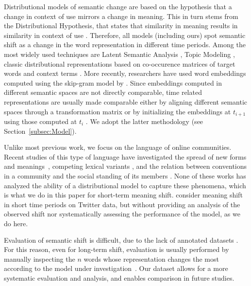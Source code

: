Distributional models of semantic change are based on the hypothesis
that a change in context of use mirrors a change in meaning.
This in turn stems from the Distributional Hypothesis, that states
that similarity in meaning results in similarity in context of use \cite{harris1954distributional}.
Therefore, all models (including ours) spot semantic shift as a change in the word representation in different time periods.
Among the most widely used techniques are Latent Semantic Analysis \cite{sagi2011tracing,jatowt2014framework}, Topic Modeling \cite{wijaya2011understanding}, classic distributional representations based on co-occurence matrices of target words and context terms \cite{gulordava2011distributional}.
 More recently, researchers have used word embeddings computed using the skip-gram model by . Since embeddings computed in different semantic spaces are not directly comparable, time related representations are usually made comparable either by aligning different semantic spaces through a transformation matrix \cite{kulkarni2015statistically,azarbonyad2017words, hamilton2016diachronic} or by initializing the embeddings at $t_{i+1}$ using those computed at $t_i$ \cite{kim2014temporal,del2016tracing,phillips2017intrinsic,szymanski2017temporal}. We adopt the latter methodology (see Section~\ref{subsec:Model}).

Unlike most previous work, we focus on the language of online communities.
Recent studies of this type of language have investigated the spread of new forms and meanings~\cite{del2017semantic,del2018road,stewart2018making}, 
competing lexical variants \cite{rotabi2017competition}, and the relation between conventions in a community and 
the social standing of its members \cite{danescu2013no}. 
None of these works has analyzed the ability of a distributional model to capture these phenomena, 
which is what we do in this paper for short-term meaning shift. 
 consider meaning shift in short time periods on Twitter data, but without providing an analysis of the observed shift nor systematically assessing the performance of the model, as we do here.

Evaluation of semantic shift is difficult, due to the lack of
annotated datasets \cite{frermann2016bayesian}. For this reason, even for long-term shift, evaluation is usually performed by manually
inspecting the $n$ words whose representation changes the most
according to the model under investigation~\cite{hamilton2016diachronic,kim2014temporal}.
Our dataset allows for a more systematic evaluation and analysis, and
enables comparison in future studies.

